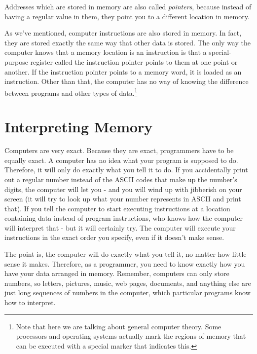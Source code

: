 Addresses which are stored in memory are also called 
\emph{pointers}, because instead of having a regular
value in them, they point you to a different location in memory.

As we've mentioned, computer instructions are also stored in memory.  
In fact, they are stored
exactly the same way that other data is stored.  The only way the computer
knows that a memory location is an instruction is that a special-purpose register called the instruction pointer points to them at one point or another.  If the instruction pointer points
to a memory word, it is loaded as an instruction.  Other than that, the 
computer has no way of knowing the difference between programs and other types
of data.\footnote{Note that here we are talking about general computer
theory.  Some processors and operating systems actually mark the regions
of memory that can be executed with a special marker that indicates this.
}

\section{Interpreting Memory}
\label{interpretingmemory}

Computers are very exact.  Because they are exact, programmers have to be
equally exact.  A computer has no idea what your program is supposed to
do.  Therefore, it will only do exactly what you tell it to do.  If you
accidentally print out a regular number instead of the ASCII codes that make up the number's digits, the
computer will let you - and you will wind up with jibberish on your screen (it will try to look up what your number represents in ASCII and print that).
If you tell the computer to start executing instructions at a location
containing data instead of program instructions, who knows how the computer will interpret that - 
but it will certainly try.  The computer will execute your instructions in
the exact order you specify, even if it doesn't make sense.

The point is, the computer will do exactly
what you tell it, no matter how little sense it makes.  Therefore, as
a programmer, you need to know exactly how you have your data arranged
in memory.  Remember, computers can only store numbers, so letters, pictures,
music, web pages, documents, and anything else are just long sequences
of numbers in the computer, which particular programs know how to interpret.

